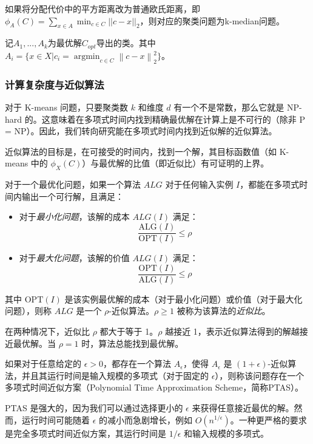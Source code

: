 \documentclass[lang=cn,newtx,10pt,scheme=chinese,chinesefont=nofont,citestyle=gb7714-2015, bibstyle=gb7714-2015]{elegantbook}
\begin{document}
\begin{refsection}
\begin{remark}
如果将分配代价中的平方距离改为普通欧氏距离，即$\phi_A(C) = \sum_{x \in A} \min_{c \in C} ||c - x||_2$，则对应的聚类问题为k-median问题。
\end{remark}


\begin{definition}
    记$A_1,...,A_k$为最优解$C_{opt}$导出的类。其中$A_i=\{x\in X|c_i=\mathop{argmin}_{c\in C}\left\lVert c-x \right\rVert_2^2\}$。
\end{definition}
\subsubsection{计算复杂度与近似算法}

对于 K-means 问题，只要聚类数 $k$ 和维度 $d$ 有一个不是常数，那么它就是 NP-hard 的。这意味着在多项式时间内找到精确最优解在计算上是不可行的（除非 P = NP）。因此，我们转向研究能在多项式时间内找到近似解的近似算法。

近似算法的目标是，在可接受的时间内，找到一个解，其目标函数值（如 K-means 中的 $\phi_X(C)$）与最优解的比值（即近似比）有可证明的上界。

\begin{definition}
对于一个最优化问题，如果一个算法 $ALG$ 对于任何输入实例 $I$，都能在多项式时间内输出一个可行解，且满足：
\begin{itemize}
    \item 对于\emph{最小化问题}，该解的成本 $ALG(I)$ 满足：
    \[
    \frac{\mathrm{ALG}(I)}{\mathrm{OPT}(I)} \leq \rho
    \]
    \item 对于\emph{最大化问题}，该解的价值 $ALG(I)$ 满足：
    \[
    \frac{\mathrm{OPT}(I)}{\mathrm{ALG}(I)} \leq \rho
    \]
\end{itemize}
其中 $\mathrm{OPT}(I)$ 是该实例最优解的成本（对于最小化问题）或价值（对于最大化问题），则称 $ALG$ 是一个 $\rho$-近似算法。$\rho \geq 1$ 被称为该算法的\emph{近似比}。
\end{definition}
在两种情况下，近似比 $\rho$ 都大于等于 1。$\rho$ 越接近 1，表示近似算法得到的解越接近最优解。当 $\rho = 1$ 时，算法总能找到最优解。
\begin{definition}[多项式时间近似方案]
如果对于任意给定的 $\epsilon > 0$，都存在一个算法 $A_\epsilon$，使得 $A_\epsilon$ 是 $(1+\epsilon)$-近似算法，并且其运行时间是输入规模的多项式（对于固定的 $\epsilon$），则称该问题存在一个多项式时间近似方案（Polynomial Time Approximation Scheme，简称PTAS）。
\end{definition}
PTAS 是强大的，因为我们可以通过选择更小的 $\epsilon$ 来获得任意接近最优的解。然而，运行时间可能随着 $\epsilon$ 的减小而急剧增长，例如 $O(n^{1/\epsilon})$。一种更严格的要求是完全多项式时间近似方案，其运行时间是 $1/\epsilon$ 和输入规模的多项式。

\end{refsection}
\end{document}

